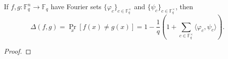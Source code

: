 \begin{theorem}
\label{lem:distance-between-functions-via-fourier-sets}
\leanok
If $f,g : \mathbb{F}_q^n \to \mathbb{F}_q$ have Fourier sets
  $\{\varphi_c\}_{c \in \mathbb{F}_q^\times}$ and
  $\{\psi_c\}_{c \in \mathbb{F}_q^\times}$, then
  \[
    \Delta(f,g)
    = \Pr_x[f(x)\neq g(x)]
    = 1 - \frac{1}{q}\left(1 + \sum_{c \in \mathbb{F}_q^\times}
      \langle \varphi_c,\psi_c\rangle\right).
  \]
\end{theorem}
\begin{proof}
\end{proof}
